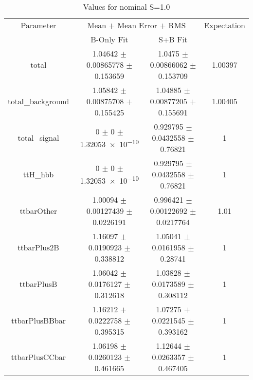 \begin{table}
\centering
\caption{Values for nominal S=1.0}
\begin{tabular}{cccc}
\toprule
Parameter & \multicolumn{2}{c}{Mean $\pm$ Mean Error $\pm$ RMS} & Expectation\\
 & B-Only Fit & S+B Fit & \\
\midrule
total & \num{1.04642} $\pm$ \num{0.00865778} $\pm$ \num{0.153659} & \num{1.0475} $\pm$ \num{0.00866062} $\pm$ \num{0.153709} & \num{1.00397}\\
total\_background & \num{1.05842} $\pm$ \num{0.00875708} $\pm$ \num{0.155425} & \num{1.04885} $\pm$ \num{0.00877205} $\pm$ \num{0.155691} & \num{1.00405}\\
total\_signal & \num{0} $\pm$ \num{0} $\pm$ \num{1.32053e-10} & \num{0.929795} $\pm$ \num{0.0432558} $\pm$ \num{0.76821} & \num{1}\\
ttH\_hbb & \num{0} $\pm$ \num{0} $\pm$ \num{1.32053e-10} & \num{0.929795} $\pm$ \num{0.0432558} $\pm$ \num{0.76821} & \num{1}\\
ttbarOther & \num{1.00094} $\pm$ \num{0.00127439} $\pm$ \num{0.0226191} & \num{0.996421} $\pm$ \num{0.00122692} $\pm$ \num{0.0217764} & \num{1.01}\\
ttbarPlus2B & \num{1.16097} $\pm$ \num{0.0190923} $\pm$ \num{0.338812} & \num{1.05041} $\pm$ \num{0.0161958} $\pm$ \num{0.28741} & \num{1}\\
ttbarPlusB & \num{1.06042} $\pm$ \num{0.0176127} $\pm$ \num{0.312618} & \num{1.03828} $\pm$ \num{0.0173589} $\pm$ \num{0.308112} & \num{1}\\
ttbarPlusBBbar & \num{1.16212} $\pm$ \num{0.0222758} $\pm$ \num{0.395315} & \num{1.07275} $\pm$ \num{0.0221545} $\pm$ \num{0.393162} & \num{1}\\
ttbarPlusCCbar & \num{1.06198} $\pm$ \num{0.0260123} $\pm$ \num{0.461665} & \num{1.12644} $\pm$ \num{0.0263357} $\pm$ \num{0.467405} & \num{1}\\
\bottomrule
\end{tabular}
\end{table}